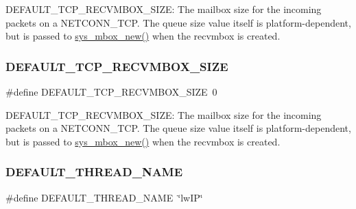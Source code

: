 D\+E\+F\+A\+U\+L\+T\+\_\+\+T\+C\+P\+\_\+\+R\+E\+C\+V\+M\+B\+O\+X\+\_\+\+S\+I\+ZE\+: The mailbox size for the incoming packets on a N\+E\+T\+C\+O\+N\+N\+\_\+\+T\+CP. The queue size value itself is platform-\/dependent, but is passed to \hyperlink{group__sys__mbox_gab9793f30642de06ce87827e9adbe30cc}{sys\+\_\+mbox\+\_\+new()} when the recvmbox is created. \mbox{\label{group__lwip__opts__thread_ga1bd172938b9c8ba63156fcafc87e83c7}} 
\subsubsection{\texorpdfstring{D\+E\+F\+A\+U\+L\+T\+\_\+\+T\+C\+P\+\_\+\+R\+E\+C\+V\+M\+B\+O\+X\+\_\+\+S\+I\+ZE}{DEFAULT\_TCP\_RECVMBOX\_SIZE}\hspace{0.1cm}{\footnotesize\ttfamily [2/2]}}
{\footnotesize\ttfamily \#define D\+E\+F\+A\+U\+L\+T\+\_\+\+T\+C\+P\+\_\+\+R\+E\+C\+V\+M\+B\+O\+X\+\_\+\+S\+I\+ZE~0}

D\+E\+F\+A\+U\+L\+T\+\_\+\+T\+C\+P\+\_\+\+R\+E\+C\+V\+M\+B\+O\+X\+\_\+\+S\+I\+ZE\+: The mailbox size for the incoming packets on a N\+E\+T\+C\+O\+N\+N\+\_\+\+T\+CP. The queue size value itself is platform-\/dependent, but is passed to \hyperlink{group__sys__mbox_gab9793f30642de06ce87827e9adbe30cc}{sys\+\_\+mbox\+\_\+new()} when the recvmbox is created. \mbox{\label{group__lwip__opts__thread_gaca13123a5c8271558353e04123957616}} 
\subsubsection{\texorpdfstring{D\+E\+F\+A\+U\+L\+T\+\_\+\+T\+H\+R\+E\+A\+D\+\_\+\+N\+A\+ME}{DEFAULT\_THREAD\_NAME}\hspace{0.1cm}{\footnotesize\ttfamily [1/2]}}
{\footnotesize\ttfamily \#define D\+E\+F\+A\+U\+L\+T\+\_\+\+T\+H\+R\+E\+A\+D\+\_\+\+N\+A\+ME~\char`\"{}lw\+IP\char`\"{}}

